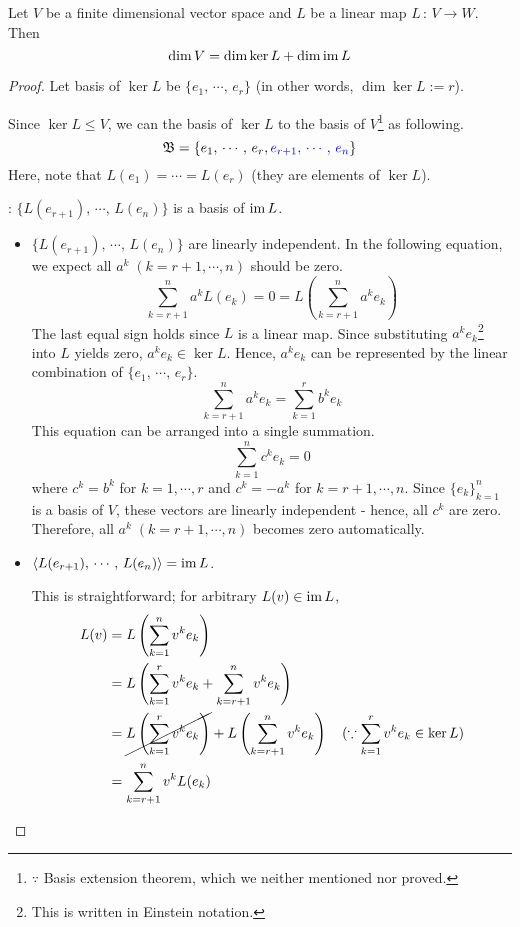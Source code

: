 \documentclass[a4paper, 10pt]{article}
\begin{document}

\begin{theorem}
    Let $V$ be a finite dimensional vector space and $L$ be a linear map $L \,:\, V \rightarrow W$. Then
    \[ \dim V = \dim \ker L + \dim \mathrm{im}\, L \]
\end{theorem}
\begin{proof}
    Let basis of $\ker L$ be $\{ e_{1} ,\, \cdots ,\, e_{r} \}$ (in other words, $\dim \ker L := r$).

    Since $\ker L \leq V$, we can  the basis of $\ker L$ to the basis of $V$\footnote{$\because$ Basis extension theorem, which we neither mentioned nor proved.} as following.
    \[ \mathfrak{B} = \{ e_{1} ,\, \cdots ,\, e_{r}, \textcolor{blue}{e_{r+1} ,\, \cdots ,\, e_{n}} \} \]
    Here, note that $L(e_{1}) = \cdots = L(e_{r})$ (they are elements of $\ker L$).

    : $\{ L(e_{r+1}) ,\, \cdots ,\, L(e_{n}) \}$ is a basis of $\mathrm{im}\, L$.
    \begin{itemize}
        \item[(1)] $\{ L(e_{r+1}) ,\, \cdots ,\, L(e_{n}) \}$ are linearly independent. In the following equation, we expect all $a^{k} \; (k = r+1, \cdots, n)$ should be zero.
        \[ \sum_{k = r+1}^{n} a^{k} L(e_{k}) = 0 = L \left(\sum_{k = r+1}^{n} a^{k}e_{k}\right) \]
        The last equal sign holds since $L$ is a linear map. Since substituting $a^{k}e_{k}$\footnote{This is written in Einstein notation.} into $L$ yields zero, $a^{k}e_{k} \in \ker L$. Hence, $a^{k}e_{k}$ can be represented by the linear combination of $\{ e_{1} ,\, \cdots ,\, e_{r} \}$.
        \[ \sum_{k=r+1}^{n}a^{k}e_{k} = \sum_{k=1}^{r}b^{k}e_{k} \]
        This equation can be arranged into a single summation.
        \[ \sum_{k=1}^{n}c^{k}e_{k} = 0 \]
        where $c^{k} = b^{k}$ for $k = 1, \cdots, r$ and $c^{k} = -a^{k}$ for $k = r+1, \cdots, n$. Since $\{e_{k}\}_{k=1}^{n}$ is a basis of $V$, these vectors are linearly independent - hence, all $c^{k}$ are zero. Therefore, all $a^{k} \; (k = r+1, \cdots, n)$ becomes zero automatically.
        \item[(2)] $\left< L(e_{r+1}) ,\, \cdots ,\, L(e_{n}) \right> = \mathrm{im}\, L$. 
        
        This is straightforward; for arbitrary $L(v) \in \mathrm{im}\, L$,
        \begin{align*}
            L(v) &= L \left(\sum_{k=1}^{n} v^{k}e_{k}\right) \\
            &= L \left(\sum_{k=1}^{r} v^{k}e_{k} + \sum_{k=r+1}^{n} v^{k}e_{k}\right) \\
            &= \cancel{L \left(\sum_{k=1}^{r} v^{k}e_{k}\right)} + L \left(\sum_{k=r+1}^{n} v^{k}e_{k}\right) \quad (\because \sum_{k=1}^{r} v^{k}e_{k} \in \ker L) \\
            &= \sum_{k=r+1}^{n} v^{k} L(e_{k})
        \end{align*}
    \end{itemize}
\end{proof}
\newpage
\end{document}
